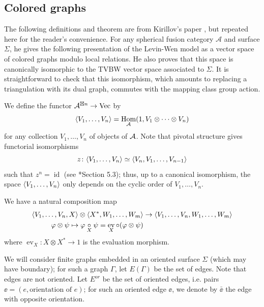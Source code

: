 \documentclass{amsart}
\DeclareMathOperator{\id}{id}
\DeclareMathOperator{\Vect}{Vec}
\DeclareMathOperator{\Hom}{Hom}
\DeclareMathOperator{\ev}{ev}
\newcommand{\one}{1}
\newcommand{\Ga}{\Gamma}
\newcommand{\ph}{\varphi}
\newcommand{\Si}{\Sigma}
\begin{document}
\subsection{Colored graphs}\label{s:colored}

The following definitions and theorem are from Kirillov's paper
 \cite{kirillovStringNets}, but repeated here for the reader's convenience.  
For any spherical fusion category $\mathcal A$ and surface $\Si$, he gives the following presentation of the Levin-Wen model
as a vector space of colored graphs modulo
local relations.  He also proves that this space 
is canonically isomorphic to the TVBW vector space associated to $\Si$.  It is
straightforward to check that this isomorphism, which amounts to replacing a 
triangulation with its dual graph,  commutes with the mapping class group action.


We define the functor $\A^{\boxtimes n}\to \Vect$ by
\begin{equation}\label{e:vev}
\<V_1,\dots,V_n\>=\Hom_\A(\one,
V_1\otimes\dots\otimes V_n)
\end{equation}
for any collection $V_1,\dots, V_n$ of objects of $\mathcal{A}$. Note that pivotal
structure gives functorial isomorphisms
\begin{equation}\label{e:cyclic}
z\colon\langle V_1,\dots,V_n\rangle\simeq \langle V_n, V_1,\dots,V_{n-1}\rangle
\end{equation}
such that $z^n=\id$ (see \cite{BK}*{Section 5.3}); thus, up to a canonical
isomorphism, the space $\langle V_1,\dots,V_n\rangle$ only depends on the cyclic order
of $V_1,\dots, V_n$.

We have a natural composition map 
\begin{equation}\label{e:composition}
\begin{aligned}
 \<V_1,\dots,V_n, X\>\otimes\<X^*, W_1,\dots,
W_m\>&\to\<V_1,\dots,V_n, W_1,\dots, W_m\>\\
\ph\otimes\psi\mapsto \ph\cc{X}\psi= \ev_X\circ (\ph\otimes\psi)
\end{aligned}
\end{equation}
where $\ev_X\colon X\otimes  X^*\to \one$ is the evaluation morphism.

We will consider finite  graphs embedded in an oriented surface $\Si$
(which may have boundary); for such a
graph $\Ga$, let $E(\Ga)$ be the set of edges. Note that edges are not
oriented. Let $E^{or}$ be the set of oriented edges, i.e. pairs $\ee=(e,
\text{orientation of } e)$; for such an oriented edge $\ee$, we denote by
$\bar{\ee}$ the edge with opposite orientation.
\end{document}
